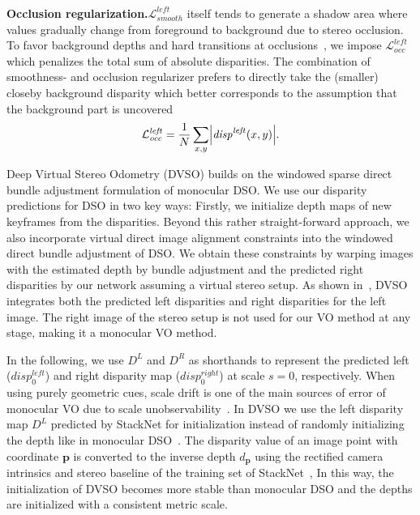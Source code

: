 \documentclass[runningheads]{llncs}
\begin{document}
\textbf{Occlusion regularization.}$\mathcal{L}_{\mathit{smooth}}^{\mathit{left}}$ itself tends to generate a 
shadow area where values gradually change from foreground to background due to 
stereo occlusion. To favor background depths and hard transitions at 
occlusions~\cite{zhong2017self}, we impose 
$\mathcal{L}_{\mathit{occ}}^{\mathit{left}}$ which penalizes the 
total sum of absolute disparities. The combination of smoothness- and 
occlusion regularizer prefers to directly take the (smaller) closeby background 
disparity which better corresponds to the assumption that the background part 
is uncovered
\begin{equation}
\mathcal{L}_{\mathit{occ}}^{\mathit{left}}  = \frac{1}{N} \sum_{x, y}\Bigl\lvert 
\mathit{disp}^{\mathit{left}}(x, y)\Bigr\rvert.
\end{equation}

Deep Virtual Stereo Odometry (DVSO) builds on the windowed sparse direct bundle adjustment formulation of monocular DSO.
We use our disparity predictions for DSO in two key ways:
Firstly, we initialize depth maps of new keyframes from the disparities.
Beyond this rather straight-forward approach, we also incorporate virtual direct image alignment constraints into the windowed direct bundle adjustment of DSO.
We obtain these constraints by warping images with the estimated depth by bundle adjustment and the predicted right disparities by our network assuming a virtual stereo setup. 
As shown in~, DVSO integrates both the predicted left disparities and right disparities for the left image. 
The right image of the stereo setup is not used for our VO method at any stage, making it a monocular VO method.

In the following, we use 
$D^{L}$ and $D^{R}$ 
as shorthands to represent the predicted left 
($disp_0^{left}$) and right disparity map 
($disp_0^{right}$) at 
scale $s = 0$, respectively.
When using purely geometric cues, scale drift is one of the main sources of 
error of monocular VO due to scale unobservability~\cite{strasdat2010scale}. 
In DVSO we use the left disparity map 
$D^{L}$ predicted by StackNet for initialization instead of randomly initializing the depth like in monocular 
DSO~\cite{engel2017direct}. 
The disparity value of an image point with coordinate $\mathbf{p}$ is converted to the inverse 
depth $d_\mathbf{p}$ using the rectified camera 
intrinsics and stereo baseline of the training set of 
StackNet~\cite{hartley2003multiple},
In this way, the initialization of DVSO becomes more stable than monocular 
DSO and the depths are initialized with a consistent metric scale. 
\end{document}
